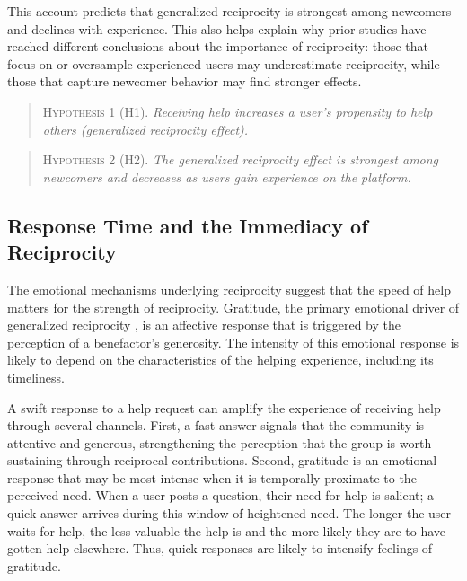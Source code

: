 This account predicts that generalized reciprocity is strongest among newcomers and declines with experience. This also helps explain why prior studies have reached different conclusions about the importance of reciprocity: those that focus on or oversample experienced users may underestimate reciprocity, while those that capture newcomer behavior may find stronger effects.

\begin{quote}
\textsc{Hypothesis 1 (H1).} \emph{Receiving help increases a user's propensity to help others (generalized reciprocity effect).}
\end{quote}

\begin{quote}
\textsc{Hypothesis 2 (H2).} \emph{The generalized reciprocity effect is strongest among newcomers and decreases as users gain experience on the platform.}
\end{quote}

\subsection{Response Time and the Immediacy of Reciprocity}

The emotional mechanisms underlying reciprocity suggest that the speed of help matters for the strength of reciprocity. Gratitude, the primary emotional driver of generalized reciprocity \citep{mccullough_is_2001}, is an affective response that is triggered by the perception of a benefactor's generosity. The intensity of this emotional response is likely to depend on the characteristics of the helping experience, including its timeliness.

A swift response to a help request can amplify the experience of receiving help through several channels. First, a fast answer signals that the community is attentive and generous, strengthening the perception that the group is worth sustaining through reciprocal contributions. Second, gratitude is an emotional response that may be most intense when it is temporally proximate to the perceived need. When a user posts a question, their need for help is salient; a quick answer arrives during this window of heightened need. The longer the user waits for help, the less valuable the help is and the more likely they are to have gotten help elsewhere. Thus, quick responses are likely to intensify feelings of gratitude.

